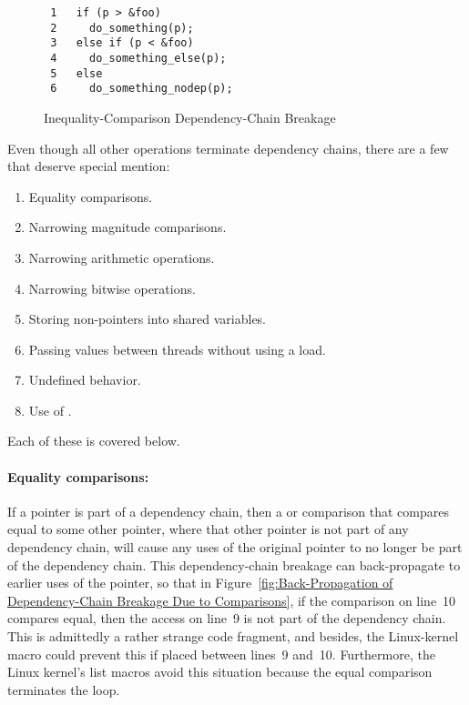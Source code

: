 \documentclass[letterpaper,twocolumn,10pt]{article}
\begin{document}
\begin{figure}[tbp]
{ \scriptsize
\begin{verbatim}
 1   if (p > &foo)
 2     do_something(p);
 3   else if (p < &foo)
 4     do_something_else(p);
 5   else
 6     do_something_nodep(p);
\end{verbatim}
}
\caption{Inequality-Comparison Dependency-Chain Breakage}
\label{fig:Inequality-Comparison Dependency-Chain Breakage}
\end{figure}

Even though all other operations terminate dependency chains, there
are a few that deserve special mention:

\begin{enumerate}
\item	Equality comparisons.
\item	Narrowing magnitude comparisons.
\item	Narrowing arithmetic operations.
\item	Narrowing bitwise operations.
\item	Storing non-pointers into shared variables.
\item	Passing values between threads without using
	a  load.
\item	Undefined behavior.
\item	Use of .
\end{enumerate}

Each of these is covered below.

\paragraph{Equality comparisons:}
If a pointer is part of a dependency chain, then a \co{==}
or \co{!=} comparison that compares equal to some other pointer,
where that other pointer is not part of any dependency chain,
will cause any uses of the original pointer to no longer
be part of the dependency chain.
This dependency-chain breakage can back-propagate to earlier uses
of the pointer, so that in
Figure~\ref{fig:Back-Propagation of Dependency-Chain Breakage Due to Comparisons},
if the comparison on line~10 compares equal, then the access on
line~9 is not part of the dependency chain.
This is admittedly a rather strange code fragment, and besides,
the Linux-kernel  macro could prevent this if
placed between lines~9 and~10.
Furthermore, the Linux kernel's list macros avoid this situation
because the equal comparison terminates the loop.
\end{document}
